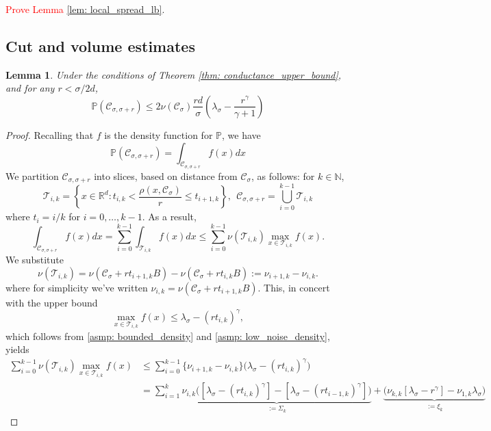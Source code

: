 \documentclass{article}
\newcommand{\set}[1]{\left\{#1\right\}}
\newcommand{\N}{\mathbb{N}}
\newcommand{\Reals}{\mathbb{R}}
\newcommand{\Rd}{\Reals^d}
\newcommand{\1}{\mathbf{1}}
\newcommand{\Pbb}{\mathbb{P}}
\newcommand{\Cset}{\mathcal{C}}
\newcommand{\Csig}{\Cset_{\sigma}}
\newcommand{\Csigr}{\Cset_{\sigma,\sigma + r}}
\theoremstyle{aldenthm}
\newtheorem{lemma}{Lemma}
\begin{document}
\textcolor{red}{Prove Lemma \ref{lem: local_spread_lb}}.

\subsection{Cut and volume estimates}
\begin{lemma}
	\label{lem: expected_number_boundary_points}
	Under the conditions of Theorem \ref{thm: conductance_upper_bound}, and for any $r < \sigma/2d$,
	\begin{equation*}
	\Pbb(\Csigr) \leq 2 \nu(\Csig) \frac{rd}{\sigma}  \left(\lambda_{\sigma} - \frac{r^{\gamma}}{\gamma + 1}\right)
	\end{equation*}	
\end{lemma}
\begin{proof}
	Recalling that $f$ is the density function for $\Pbb$, we have
	\begin{equation}
	\label{eqn: integral_over_epsilon_neighborhood}
	\Pbb(\Csigr) = \int_{\Csigr} f(x) dx
	\end{equation}
	We partition $\Csigr$ into slices, based on distance from $\Csig$, as follows: for $k \in \N$,
	\begin{equation*}
	\mathcal{T}_{i,k} = \set{x \in \Rd: t_{i,k} < \frac{\rho(x, \Csig)}{r} \leq t_{i+1,k}}, ~~ \Csigr = \bigcup_{i = 0}^{k-1} \mathcal{T}_{i,k}
	\end{equation*}
	where $t_i = i/k$ for $i = 0, \ldots, k - 1$. As a result,
	\begin{equation*}
	\int_{\Csigr} f(x) dx = \sum_{i = 0}^{k-1} \int_{\mathcal{T}_{i,k}} f(x) dx \leq \sum_{i = 0}^{k-1} \nu(\mathcal{T}_{i,k}) \max_{x \in \mathcal{T}_{i,k}} f(x).
	\end{equation*}
	We substitute
	\begin{equation*}
	\nu(\mathcal{T}_{i,k}) = \nu(\Csig + rt_{i+1,k}B) - \nu(\Csig + rt_{i,k}B) := \nu_{i+1,k} - \nu_{i,k}. 
	\end{equation*}
	where for simplicity we've written $\nu_{i,k} = \nu(\Csig + rt_{i+1,k}B)$.
	This, in concert with the upper bound
	\begin{equation*}
	\max_{x \in \mathcal{T}_{i,k}} f(x) \leq \lambda_{\sigma} - (rt_{i,k})^{\gamma},
	\end{equation*}
	which follows from \ref{asmp: bounded_density} and \ref{asmp: low_noise_density}, yields
	\begin{align}
	\label{eqn: telescoping_sum}
	\sum_{i = 0}^{k-1} \nu(\mathcal{T}_{i,k}) \max_{x \in \mathcal{T}_{i,k}} f(x) & \leq \sum_{i = 0}^{k-1} \biggl\{ \nu_{i+1,k} - \nu_{i,k} \biggr\} \biggl( \lambda_{\sigma} - (rt_{i,k})^{\gamma} \biggr) \nonumber \\
	& = \sum_{i = 1}^{k} 
	\underbrace{\nu_{i,k} \biggl( \left[\lambda_{\sigma} - (rt_{i,k})^{\gamma}\right] -  \left[\lambda_{\sigma} - (rt_{i-1,k})^{\gamma}\right]\biggr)}_{:= \Sigma_k} + \underbrace{\biggl(\nu_{k,k}\left[\lambda_{\sigma} - r^{\gamma}\right] - \nu_{1,k}\lambda_{\sigma} \biggr)}_{:= \xi_k}
	\end{align}
	

\end{proof}
\end{document}
